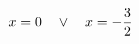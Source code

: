 \documentclass[preview]{standalone}
\begin{document}
\begin{align*}
\special{dvisvgm:raw <g id='unique000'>}x=0 \quad \lor \quad x=- \frac{3}{2}\special{dvisvgm:raw </g>}
\end{align*}
\end{document}
